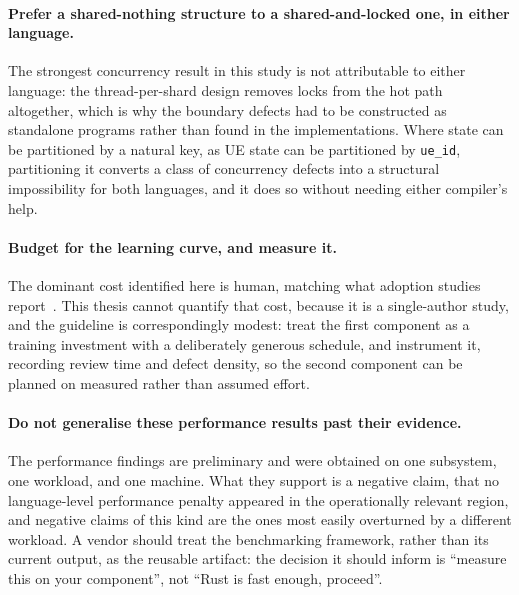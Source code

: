 \documentclass[english,twoside,openright,a4paper,censored,csm,software-track-2020]{HYthesisML}
\begin{document}
\paragraph{Prefer a shared-nothing structure to a shared-and-locked one, in either language.}
The strongest concurrency result in this study is not attributable to either language: the
thread-per-shard design removes locks from the hot path altogether, which is why the boundary
defects had to be constructed as standalone programs rather than found in the implementations.
Where state can be partitioned by a natural key, as UE state can be partitioned by
\texttt{ue\_id}, partitioning it converts a class of concurrency defects into a structural
impossibility for both languages, and it does so without needing either compiler's help.

\paragraph{Budget for the learning curve, and measure it.}
The dominant cost identified here is human, matching what adoption studies
report~\cite{fulton2021adopting}. This thesis cannot quantify that cost, because it is a
single-author study, and the guideline is correspondingly modest: treat the first component as
a training investment with a deliberately generous schedule, and instrument it, recording
review time and defect density, so the second component can be planned on measured rather than
assumed effort.

\paragraph{Do not generalise these performance results past their evidence.}
The performance findings are preliminary and were obtained on one subsystem, one workload, and
one machine. What they support is a negative claim, that no language-level performance penalty
appeared in the operationally relevant region, and negative claims of this kind are the ones
most easily overturned by a different workload. A vendor should treat the benchmarking
framework, rather than its current output, as the reusable artifact: the decision it should
inform is ``measure this on your component'', not ``Rust is fast enough, proceed''.
\end{document}
